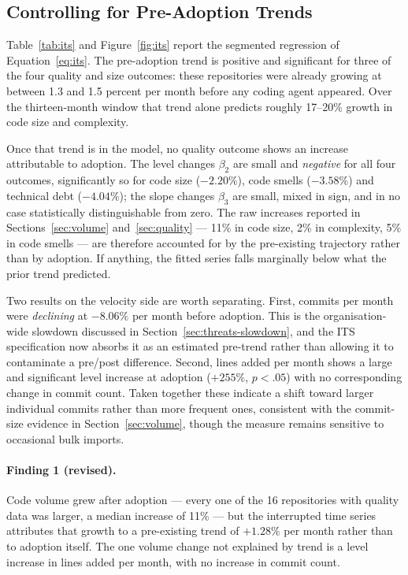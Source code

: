 \subsection{Controlling for Pre-Adoption Trends}
\label{sec:its-results}

Table~\ref{tab:its} and Figure~\ref{fig:its} report the segmented regression of
Equation~\ref{eq:its}. The pre-adoption trend is positive and significant for
three of the four quality and size outcomes: these repositories were already
growing at between \SI{1.3}{} and \SI{1.5}{} percent per month before any
coding agent appeared. Over the thirteen-month window that trend alone
predicts roughly 17--20\% growth in code size and complexity.

Once that trend is in the model, no quality outcome shows an increase
attributable to adoption. The level changes $\beta_2$ are small and
\emph{negative} for all four outcomes, significantly so for code size
($-2.20\%$), code smells ($-3.58\%$) and technical debt ($-4.04\%$); the slope
changes $\beta_3$ are small, mixed in sign, and in no case statistically
distinguishable from zero. The raw increases reported in
Sections~\ref{sec:volume} and~\ref{sec:quality} --- 11\% in code size, 2\% in
complexity, 5\% in code smells --- are therefore accounted for by the
pre-existing trajectory rather than by adoption. If anything, the fitted series
falls marginally below what the prior trend predicted.

Two results on the velocity side are worth separating. First, commits per
month were \emph{declining} at $-8.06\%$ per month before adoption. This is the
organisation-wide slowdown discussed in Section~\ref{sec:threats-slowdown},
and the ITS specification now absorbs it as an estimated pre-trend rather than
allowing it to contaminate a pre/post difference. Second, lines added per month
shows a large and significant level increase at adoption ($+255\%$,
$p < .05$) with no corresponding change in commit count. Taken together these
indicate a shift toward larger individual commits rather than more frequent
ones, consistent with the commit-size evidence in Section~\ref{sec:volume},
though the measure remains sensitive to occasional bulk imports.



\paragraph{Finding 1 (revised).} Code volume grew after adoption --- every one
of the 16 repositories with quality data was larger, a median increase of 11\%
--- but the interrupted time series attributes that growth to a pre-existing
trend of $+1.28\%$ per month rather than to adoption itself. The one volume
change not explained by trend is a level increase in lines added per month,
with no increase in commit count.

